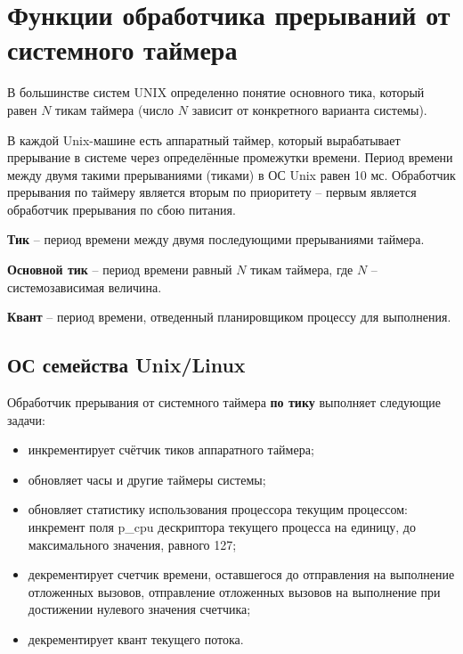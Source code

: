 \chapter{Функции обработчика прерываний от системного таймера}

В большинстве систем UNIX определенно понятие основного тика, который равен $N$ тикам таймера (число $N$ зависит от конкретного варианта системы).

В каждой {\ttfamily Unix}-машине есть аппаратный таймер, который вырабатывает прерывание в системе через определённые промежутки времени. Период времени между двумя такими прерываниями (тиками) в ОС {\ttfamily Unix} равен 10 мс. Обработчик прерывания по таймеру является вторым по приоритету – первым является обработчик прерывания по сбою питания.

\textbf{Тик} -- период времени между двумя последующими прерываниями таймера.

\textbf{Основной тик} -- период времени равный $N$ тикам таймера, где $N$ -- системозависимая величина.

\textbf{Квант} -- период времени, отведенный планировщиком процессу для выполнения.

\section{ОС семейства Unix/Linux}

Обработчик прерывания от системного таймера \textbf{по тику} выполняет следующие задачи:
\begin{itemize}
	\item инкрементирует счётчик тиков аппаратного таймера;
	\item обновляет часы и другие таймеры системы;
	\item обновляет статистику использования процессора текущим процессом: инкремент поля {\ttfamily p\_cpu} дескриптора текущего процесса на единицу, до максимального значения, равного 127;
	\item декрементирует счетчик времени, оставшегося до отправления на выполнение отложенных вызовов, отправление отложенных вызовов на выполнение при достижении нулевого значения счетчика;
	\item декрементирует квант текущего потока.
\end{itemize}

